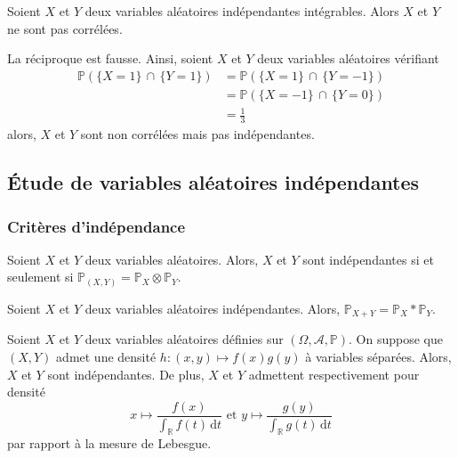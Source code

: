   \begin{proposition}
    Soient $X$ et $Y$ deux variables aléatoires indépendantes intégrables. Alors $X$ et $Y$ ne sont pas corrélées.
  \end{proposition}

  \begin{cexample}
    La réciproque est fausse. Ainsi, soient $X$ et $Y$ deux variables aléatoires vérifiant
    \begin{align*}
      \mathbb{P}(\{ X = 1 \} \, \cap \, \{ Y = 1 \}) &= \mathbb{P}(\{ X = 1 \} \, \cap \, \{ Y = -1 \}) \\
      &= \mathbb{P}(\{ X = -1 \} \, \cap \, \{ Y = 0 \}) \\
      &= \frac{1}{3}
    \end{align*}
    alors, $X$ et $Y$ sont non corrélées mais pas indépendantes.
  \end{cexample}

  \subsection{Étude de variables aléatoires indépendantes}

  \subsubsection{Critères d'indépendance}


  \begin{theorem}
    Soient $X$ et $Y$ deux variables aléatoires. Alors, $X$ et $Y$ sont indépendantes si et seulement si $\mathbb{P}_{(X,Y)} = \mathbb{P}_X \otimes \mathbb{P}_Y$.
  \end{theorem}

  \begin{corollary}
    Soient $X$ et $Y$ deux variables aléatoires indépendantes. Alors, $\mathbb{P}_{X+Y} = \mathbb{P}_X * \mathbb{P}_Y$.
  \end{corollary}


  \begin{proposition}
    Soient $X$ et $Y$ deux variables aléatoires définies sur $(\Omega, \mathcal{A}, \mathbb{P})$. On suppose que $(X,Y)$ admet une densité $h : (x,y) \mapsto f(x) g(y)$ à variables séparées. Alors, $X$ et $Y$ sont indépendantes. De plus, $X$ et $Y$ admettent respectivement pour densité
    \[ x \mapsto \frac{f(x)}{\int_{\mathbb{R}} f(t) \, \mathrm{d}t} \text{ et } y \mapsto \frac{g(y)}{\int_{\mathbb{R}} g(t) \, \mathrm{d}t} \]
    par rapport à la mesure de Lebesgue.
  \end{proposition}

